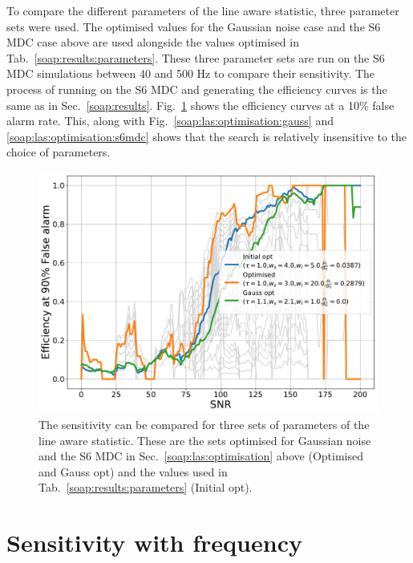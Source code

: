 To compare the different parameters of the line aware statistic, three parameter sets were used. 
The optimised values for the Gaussian noise case and the S6 \gls{MDC} case above are used alongside the values optimised in Tab.~\ref{soap:results:parameters}.
These three parameter sets are run on the S6 \gls{MDC} simulations between 40 and 500 Hz to compare their sensitivity. 
The process of running on the S6 \gls{MDC} and generating the efficiency curves is the same as in Sec.~\ref{soap:results}.
Fig.~\ref{soap:las:optimisation:comparison} shows the efficiency curves at a 10\% false alarm rate. 
This, along with Fig.~\ref{soap:las:optimisation:gauss} and \ref{soap:las:optimisation:s6mdc} shows that the search is relatively insensitive to the choice of parameters.

\begin{figure}[h]
	\centering
	\includegraphics[width=0.9\linewidth]{C3_soap/optimised_comparison.pdf}
	\caption[Comparison of three sets of parameters of the line aware statistic.]{The sensitivity can be compared for three sets of parameters of the line aware statistic. These are the sets optimised for Gaussian noise and the S6 \gls{MDC} in Sec.~\ref{soap:las:optimisation} above (Optimised and Gauss opt) and the values used in Tab.~\ref{soap:results:parameters} (Initial opt). }
	\label{soap:las:optimisation:comparison}
\end{figure}


\clearpage

\section{\label{soap:sensfreq}Sensitivity with frequency}

